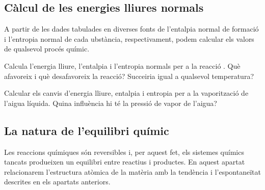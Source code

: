 \subsection{Càlcul de les energies lliures normals}

A partir de les dades tabulades en diverses fonts de l'entalpia normal de formació i l'entropia normal de cada ubstància, respectivament, podem calcular els valors de qualsevol procés químic.
\begin{exr}
Calcula l'energia lliure, l'entalpia i l'entropia normals per a la reacció . Què afavoreix i què desafavoreix la reacció? Succeiria igual a qualsevol temperatura?
\end{exr}

\begin{exr}
Calcular els canvis d'energia lliure, entalpia i entropia per a la vaporització de l'aigua líquida. Quina influència hi té la pressió de vapor de l'aigua?
\end{exr}

\subsection{La natura de l'equilibri químic}

Les reaccions químiques són reversibles i, per aquest fet, els sistemes químics tancats produeixen un equilibri entre reactius i productes.
En aquest apartat relacionarem l'estructura atòmica de la matèria amb la tendència i l'espontaneïtat descrites en els apartats anteriors.

